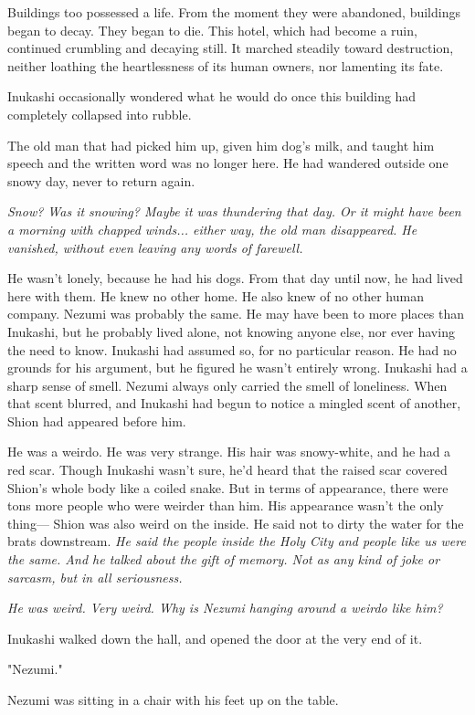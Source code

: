 Buildings too possessed a life. From the moment they were abandoned,
buildings began to decay. They began to die. This hotel, which had
become a ruin, continued crumbling and decaying still. It marched
steadily toward destruction, neither loathing the heartlessness of its
human owners, nor lamenting its fate.

Inukashi occasionally wondered what he would do once this building had
completely collapsed into rubble.

The old man that had picked him up, given him dog's milk, and taught him
speech and the written word was no longer here. He had wandered outside
one snowy day, never to return again.

\emph{Snow? Was it snowing? Maybe it was thundering that day. Or it might have
been a morning with chapped winds... either way, the old man
disappeared. He vanished, without even leaving any words of farewell.}

He wasn't lonely, because he had his dogs. From that day until now, he
had lived here with them. He knew no other home. He also knew of no
other human company. Nezumi was probably the same. He may have been to
more places than Inukashi, but he probably lived alone, not knowing
anyone else, nor ever having the need to know. Inukashi had assumed so,
for no particular reason. He had no grounds for his argument, but he
figured he wasn't entirely wrong. Inukashi had a sharp sense of smell.
Nezumi always only carried the smell of loneliness. When that scent
blurred, and Inukashi had begun to notice a mingled scent of another,
Shion had appeared before him.

He was a weirdo. He was very strange. His hair was snowy-white, and he
had a red scar. Though Inukashi wasn't sure, he'd heard that the raised
scar covered Shion's whole body like a coiled snake. But in terms of
appearance, there were tons more people who were weirder than him. His
appearance wasn't the only thing--- Shion was also weird on the inside. He
said not to dirty the water for the brats downstream. \emph{He said the people
inside the Holy City and people like us were the same. And he talked
about the gift of memory. Not as any kind of joke or sarcasm, but in all
seriousness.}

\emph{He was weird. Very weird. Why is Nezumi hanging around a weirdo like
him?}

Inukashi walked down the hall, and opened the door at the very end of
it.

"Nezumi."

Nezumi was sitting in a chair with his feet up on the table.

